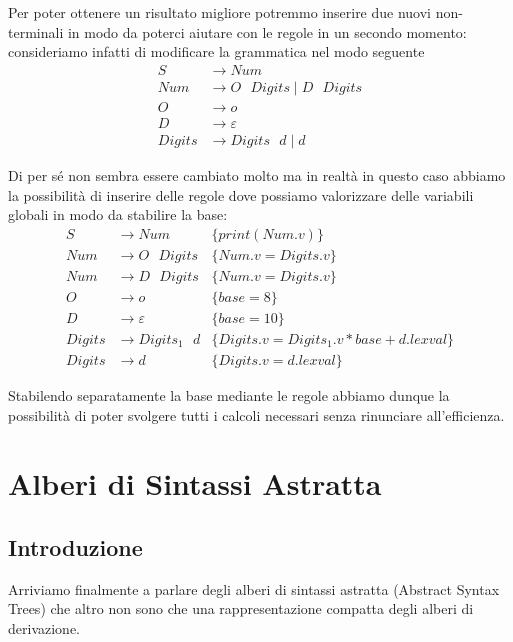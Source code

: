 \documentclass[class=book, crop=false, oneside, 12pt]{standalone}
\begin{document}
Per poter ottenere un risultato migliore potremmo inserire due nuovi non-terminali in modo da poterci aiutare con le regole in un secondo momento: consideriamo infatti di modificare la grammatica nel modo seguente
\begin{align*}
    S &\to Num \\
    Num &\to O \textrm{ } Digits \mid D \textrm{ } Digits \\
    O &\to o \\ 
    D &\to \varepsilon \\
    Digits &\to Digits \textrm{ } d \mid d
\end{align*}

Di per sé non sembra essere cambiato molto ma in realtà in questo caso abbiamo la possibilità di inserire delle regole dove possiamo valorizzare delle variabili globali in modo da stabilire la base:
\begin{align*}
    S &\to Num &\{print(Num.v)\}\\
    Num &\to O \textrm{ } Digits &\{Num.v = Digits.v\}\\
    Num &\to D \textrm{ } Digits &\{Num.v = Digits.v\}\\
    O &\to o &\{base = 8\}\\ 
    D &\to \varepsilon &\{base = 10\}\\
    Digits &\to Digits_1 \textrm{ } d &\{Digits.v = Digits_1.v * base + d.lexval\}\\
    Digits &\to d &\{Digits.v = d.lexval\}
\end{align*}

Stabilendo separatamente la base mediante le regole abbiamo dunque la possibilità di poter svolgere tutti i calcoli necessari senza rinunciare all'efficienza. 

\section{Alberi di Sintassi Astratta}
\subsection{Introduzione}
Arriviamo finalmente a parlare degli alberi di sintassi astratta (Abstract Syntax Trees) che altro non sono che una rappresentazione compatta degli alberi di derivazione.
\end{document}
